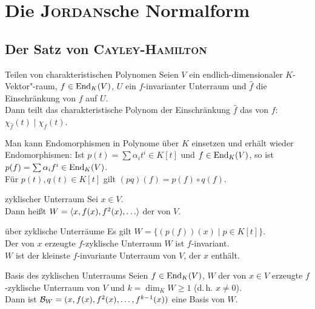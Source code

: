\section{%
    Die \textsc{Jordan}sche Normalform%
}

\subsection{%
    Der Satz von \textsc{Cayley}-\textsc{Hamilton}%
}

\begin{Satz}{Teilen von charakteristischen Polynomen}
    Seien $V$ ein endlich-dimensionaler $K$-Vektor"-raum, $f \in \operatorname{End}_K(V)$,
    $U$ ein $f$-invarianter Unterraum und $\widehat{f}$ die Einschränkung
    von $f$ auf $U$. \\
    Dann teilt das charakteristische Polynom der Einschränkung $\widehat{f}$
    das von $f$:
    $\chi_{\widehat{f}}(t) \;|\; \chi_f(t)$.
\end{Satz}

\begin{Bem}
    Man kann Endomorphismen in Polynome über $K$ einsetzen und erhält
    wieder Endomorphismen:
    Ist $p(t) = \sum \alpha_i t^i \in K[t]$ und $f \in \operatorname{End}_K(V)$,
    so ist $p(f) = \sum \alpha_i f^i \in \operatorname{End}_K(V)$. \\
    Für $p(t), q(t) \in K[t]$ gilt $(pq)(f) = p(f) \circ q(f)$.
\end{Bem}

\begin{Def}{zyklischer Unterraum}
    Sei $x \in V$. \\
    Dann heißt $W = \aufspann{x, f(x), f^2(x), \dotsc}$
    der  von $V$.
\end{Def}

\begin{Lemma}{über zyklische Unterräume}
    Es gilt $W = \{(p(f))(x) \;|\; p \in K[t]\}$. \\
    Der von $x$ erzeugte $f$-zyklische Unterraum $W$ ist $f$-invariant. \\
    $W$ ist der kleinste $f$-invariante Unterraum von $V$, der $x$ enthält.
\end{Lemma}

\begin{Satz}{Basis des zyklischen Unterraums}
    Seien $f \in \operatorname{End}_K(V)$, $W$ der von $x \in V$ erzeugte $f$-zyklische
    Unterraum von $V$ und $k = \dim_K W \ge 1$ (d.\,h. $x \not= 0$). \\
    Dann ist $\mathcal{B}_W = (x, f(x), f^2(x), \dotsc, f^{k-1}(x))$ eine
    Basis von $W$.
\end{Satz}

